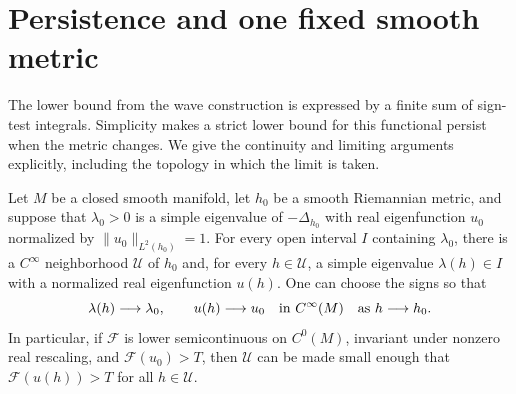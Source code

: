\section{Persistence and one fixed smooth metric}
\label{sec:persistence}

The lower bound from the wave construction is expressed by a finite
sum of sign-test integrals.  Simplicity makes a strict lower bound
for this functional persist when the metric changes.  We give the
continuity and limiting arguments
explicitly, including the topology in which the limit is taken.

\begin{lemma}
\label{lem:simple-eigenpair-continuity}
Let $M$ be a closed smooth manifold, let $h_0$ be a smooth Riemannian
metric, and suppose that $\lambda_0>0$ is a simple eigenvalue of
$-\Delta_{h_0}$ with real eigenfunction $u_0$ normalized by
$\|u_0\|_{L^2(h_0)}=1$.  For every open interval $I$ containing
$\lambda_0$, there is a $C^\infty$ neighborhood $\mathcal U$ of
$h_0$ and, for every $h\in\mathcal U$, a simple eigenvalue
$\lambda(h)\in I$ with a normalized real eigenfunction $u(h)$.
One can choose the signs so that
\[
 \lambda(h)\longrightarrow\lambda_0,
 \qquad u(h)\longrightarrow u_0\quad\hbox{in }C^\infty(M)
 \quad\hbox{as }h\longrightarrow h_0.
\]
In particular, if $\mathcal F$ is lower semicontinuous on $C^0(M)$,
invariant under nonzero real rescaling, and $\mathcal F(u_0)>T$,
then $\mathcal U$ can be made small enough that
$\mathcal F(u(h))>T$ for all $h\in\mathcal U$.
\end{lemma}

